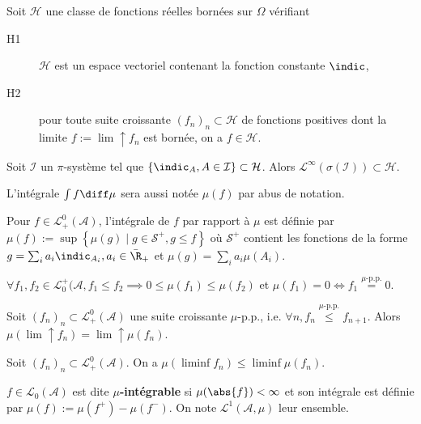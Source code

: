 	\begin{thm}
		Soit $\mathcal{H}$ une classe de fonctions réelles bornées sur $\Omega$ vérifiant
		\begin{description}
			\item[H1] $\mathcal{H}$ est un espace vectoriel contenant la fonction constante $\indic$,
			\item[H2] pour toute suite croissante $(f_n)_n \subset \mathcal{H}$ de fonctions positives dont la limite $f := \lim \uparrow f_n$ est bornée, on a $f \in \mathcal{H}$.
		\end{description}
		Soit $\mathcal{I}$ un $\pi$-système tel que $\{ \indic_A, A \in \mathcal{I} \} \subset \mathcal{H}$.
		Alors $\mathcal{L}^\infty(\sigma(\mathcal{I})) \subset \mathcal{H}$.
	\end{thm}

	\begin{note}
		L'intégrale $\int f \diff \mu$ sera aussi notée $\mu(f)$ par abus de notation.
	\end{note}
	
	\begin{defn}
		Pour $f \in \mathcal{L}^0_+(\mathcal{A})$, l'intégrale de $f$ par rapport à $\mu$ est définie par $\mu(f) := \sup \left\{ \mu(g) \mid g \in \mathcal{S}^+, g \leq f \right\}$ où $\mathcal{S}^+$ contient les fonctions de la forme $g = \sum_i a_i \indic_{A_i}, a_i \in \Bar{\R}_+$ et $\mu(g) = \sum_i a_i \mu(A_i)$.
	\end{defn}
	
	\begin{lem}
		$\forall f_1, f_2 \in \mathcal{L}_0^+(\mathcal{A}, f_1 \leq f_2 \implies 0 \leq \mu(f_1) \leq \mu(f_2)$ et $\mu(f_1) = 0 \iff f_1 \overset{\mu\text{-p.p.}}{=} 0$.
	\end{lem}
	
	\begin{thm}
		Soit $(f_n)_n \subset \mathcal{L}^0_+(\mathcal{A})$ une suite croissante $\mu$-p.p., i.e. $\forall n, f_n \overset{\mu \text{-p.p.}}{\leq} f_{n + 1}$.
		Alors $\mu(\lim \uparrow f_n) = \lim \uparrow \mu(f_n)$.
	\end{thm}
	
	\begin{lem}
		Soit $(f_n)_n \subset \mathcal{L}_+^0(\mathcal{A})$.
		On a $\mu(\liminf f_n) \leq \liminf \mu(f_n)$.
	\end{lem}
	
	\begin{defn}
		$f \in \mathcal{L}_0(\mathcal{A})$ est dite \textbf{$\mu$-intégrable} si $\mu(\abs{f}) < \infty$ et son intégrale est définie par $\mu(f) := \mu(f^+) - \mu(f^-)$.
		On note $\mathcal{L}^1(\mathcal{A},\mu)$ leur ensemble.
	\end{defn}
	
